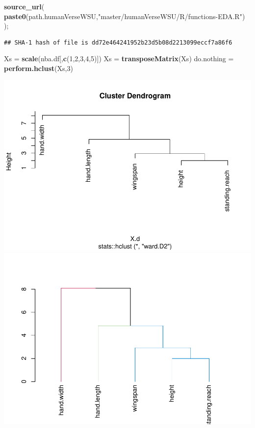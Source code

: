 \documentclass[]{article}
\newenvironment{Shaded}{\begin{snugshade}}{\end{snugshade}}
\newcommand{\DecValTok}[1]{\textcolor[rgb]{0.00,0.00,0.81}{#1}}
\newcommand{\KeywordTok}[1]{\textcolor[rgb]{0.13,0.29,0.53}{\textbf{#1}}}
\newcommand{\NormalTok}[1]{#1}
\newcommand{\StringTok}[1]{\textcolor[rgb]{0.31,0.60,0.02}{#1}}
\begin{document}
\begin{Shaded}
\begin{Highlighting}[]
\KeywordTok{source\_url}\NormalTok{( }\KeywordTok{paste0}\NormalTok{(path.humanVerseWSU,}\StringTok{"master/humanVerseWSU/R/functions{-}EDA.R"}\NormalTok{) );}
\end{Highlighting}
\end{Shaded}

\begin{verbatim}
## SHA-1 hash of file is dd72e464241952b23d5b08d2213099eccf7a86f6
\end{verbatim}

\begin{Shaded}
\begin{Highlighting}[]
\NormalTok{Xs =}\StringTok{ }\KeywordTok{scale}\NormalTok{(nba.df[,}\KeywordTok{c}\NormalTok{(}\DecValTok{1}\NormalTok{,}\DecValTok{2}\NormalTok{,}\DecValTok{3}\NormalTok{,}\DecValTok{4}\NormalTok{,}\DecValTok{5}\NormalTok{)])}
\NormalTok{Xs =}\StringTok{ }\KeywordTok{transposeMatrix}\NormalTok{(Xs)}
\NormalTok{do.nothing =}\StringTok{ }\KeywordTok{perform.hclust}\NormalTok{(Xs,}\DecValTok{3}\NormalTok{)}
\end{Highlighting}
\end{Shaded}

\includegraphics{project-measure-writeup_files/figure-latex/hclust-nba-1.pdf}
\includegraphics{project-measure-writeup_files/figure-latex/hclust-nba-2.pdf}
\end{document}
